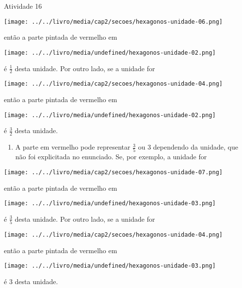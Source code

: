 \documentclass[oneside]{book}
\begin{document}
\begin{multicols}{2}
\begin{resposta*}{Atividade 16}
  \begin{imagem*}[breakable]{}{}             \texttt{[image: ../../livro/media/cap2/secoes/hexagonos-unidade-06.png]}  \end{imagem*}   então a parte pintada de vermelho em   \begin{imagem*}[breakable]{}{}             \texttt{[image: ../../livro/media/undefined/hexagonos-unidade-02.png]}  \end{imagem*}   é   $\frac{1}{2}$   desta unidade. Por outro lado,  se a unidade for   \begin{imagem*}[breakable]{}{}        \texttt{[image: ../../livro/media/cap2/secoes/hexagonos-unidade-04.png]}  \end{imagem*}   então a parte pintada de vermelho em   \begin{imagem*}[breakable]{}{}        \texttt{[image: ../../livro/media/undefined/hexagonos-unidade-02.png]}  \end{imagem*}   é   $\frac{3}{2}$   desta unidade.
\begin{enumerate} [\quad a)] %
    \item       A parte em vermelho pode representar       $\frac{3}{5}$       ou       $3$       dependendo da unidade, que não foi explicitada no enunciado. Se, por exemplo, a unidade for
\end{enumerate} %
  \begin{imagem*}[breakable]{}{}             \texttt{[image: ../../livro/media/cap2/secoes/hexagonos-unidade-07.png]}  \end{imagem*}   então a parte pintada de vermelho em   \begin{imagem*}[breakable]{}{}             \texttt{[image: ../../livro/media/undefined/hexagonos-unidade-03.png]}  \end{imagem*}   é   $\frac{3}{5}$   desta unidade. Por outro lado,  se a unidade for   \begin{imagem*}[breakable]{}{}        \texttt{[image: ../../livro/media/cap2/secoes/hexagonos-unidade-04.png]}  \end{imagem*}   então a parte pintada de vermelho em   \begin{imagem*}[breakable]{}{}        \texttt{[image: ../../livro/media/undefined/hexagonos-unidade-03.png]}  \end{imagem*}   é   $3$   desta unidade.
\end{resposta*}





\end{multicols}
\end{document}
